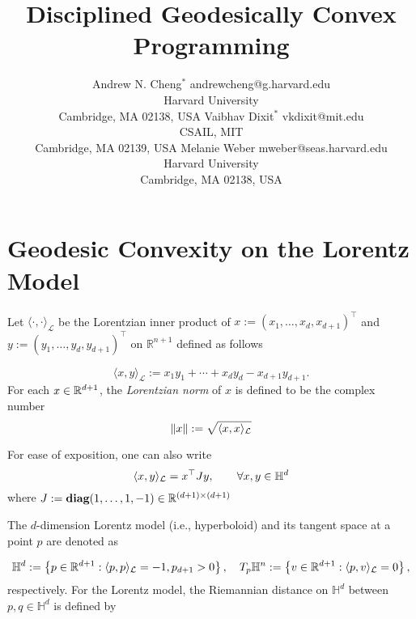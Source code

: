 \documentclass[twoside,11pt]{article}
\begin{document}
\title{Disciplined Geodesically Convex Programming}

\author{\name Andrew N. Cheng$^*$ {\email andrewcheng@g.harvard.edu \\
       \addr Harvard University\\
       Cambridge, MA 02138, USA}
       \AND
       \name Vaibhav Dixit$^*$ {\email vkdixit@mit.edu \\
       \addr CSAIL, MIT\\
       Cambridge, MA 02139, USA}
       \AND
       \name Melanie Weber \email mweber@seas.harvard.edu \\
       \addr Harvard University\\
       Cambridge, MA 02138, USA
       }


\maketitle
\def\thefootnote{*}




\section{Geodesic Convexity on the Lorentz Model}

Let $\langle\cdot, \cdot\rangle_{\mathcal{L}}$ be the Lorentzian inner product of $x:=\left(x_1, \ldots, x_d, x_{d+1}\right)^{\top}$ and $y:=\left(y_1, \ldots, y_d, y_{d+1}\right)^{\top}$ on $\mathbb{R}^{n+1}$ defined as follows

$$
\langle x, y\rangle_{\mathcal{L}}:=x_1 y_1+\cdots+x_d y_d-x_{d+1} y_{d+1} .
$$
For each $x \in \mathbb{R}^{d+1}$, the \textit{Lorentzian norm} of $x$ is defined to be the complex number 
\[
\|x\| := \sqrt{\langle x, x \rangle_{\mathcal{L}}}
\]

For ease of exposition, one can also write 
\[
\langle x, y \rangle_{\mathcal{L}} = x^\top J y, \qquad \forall x,y \in \mathbb{H}^d
\]
where $J := \textbf{diag}(1, \ldots, 1, -1) \in \mathbb{R}^{(d+1) \times (d+1)}$


The $d$-dimension Lorentz model (i.e., hyperboloid) and its tangent space at a point $p$ are denoted as 

\[
\mathbb{H}^d:=\left\{p \in \mathbb{R}^{d+1}:\langle p, p\rangle_{\mathcal{L}}=-1, p_{d+1}>0\right\}, \quad T_p \mathbb{H}^n:=\left\{v \in \mathbb{R}^{d+1}:\langle p, v\rangle_{\mathcal{L}} =0\right\},
\]
respectively. For the Lorentz model, the Riemannian distance on $\mathbb{H}^d$ between $p, q \in \mathbb{H}^d$ is defined by 
\end{document}
